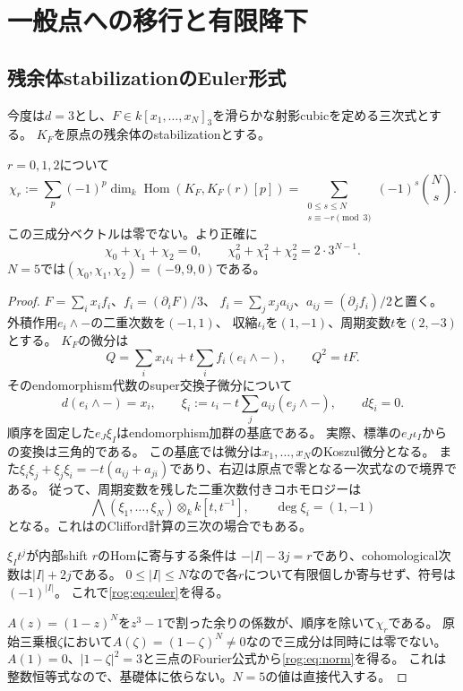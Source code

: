 \section{一般点への移行と有限降下}\label{rog:sec:generic}

\subsection{残余体stabilizationのEuler形式}

今度は$d=3$とし、$F\in k[x_1,\ldots,x_N]_3$を滑らかな射影cubicを定める三次式とする。
$K_F$を原点の残余体のstabilizationとする。
\begin{proposition}[非零のEulerベクトル]\label{rog:prop:euler}
$r=0,1,2$について
\[
 \chi_r:=\sum_p(-1)^p\dim_k\operatorname{Hom}(K_F,K_F(r)[p])
 =\sum_{\substack{0\le s\le N\\s\equiv-r\pmod3}}(-1)^s\binom Ns.
 \tag{RO3}\label{rog:eq:euler}
\]
この三成分ベクトルは零でない。より正確に
\[
 \chi_0+\chi_1+\chi_2=0,\qquad
 \chi_0^2+\chi_1^2+\chi_2^2=2\cdot3^{N-1}.
 \tag{RO4}\label{rog:eq:norm}
\]
$N=5$では$(\chi_0,\chi_1,\chi_2)=(-9,9,0)$である。
\end{proposition}
\begin{proof}
$F=\sum_i x_if_i$、$f_i=(\partial_iF)/3$、
$f_i=\sum_jx_ja_{ij}$、$a_{ij}=(\partial_jf_i)/2$と置く。
外積作用$e_i\wedge-$の二重次数を$(-1,1)$、
収縮$\iota_i$を$(1,-1)$、周期変数$t$を$(2,-3)$とする。
$K_F$の微分は
\[
 Q=\sum_i x_i\iota_i+t\sum_i f_i(e_i\wedge-),\qquad Q^2=tF.
\]
そのendomorphism代数のsuper交換子微分について
\[
 d(e_i\wedge-)=x_i,\qquad
 \xi_i:=\iota_i-t\sum_j a_{ij}(e_j\wedge-),\qquad d\xi_i=0.
\]
順序を固定した$e_J\xi_I$はendomorphism加群の基底である。
実際、標準の$e_J\iota_I$からの変換は三角的である。
この基底では微分は$x_1,\ldots,x_N$のKoszul微分となる。
また$\xi_i\xi_j+\xi_j\xi_i=-t(a_{ij}+a_{ji})$であり、右辺は原点で零となる一次式なので境界である。
従って、周期変数を残した二重次数付きコホモロジーは
\[
 \bigwedge(\xi_1,\ldots,\xi_N)\otimes_k k[t,t^{-1}],
 \qquad\deg\xi_i=(1,-1)
 \tag{RO5}\label{rog:eq:exterior}
\]
となる。これは\cite[\S5.6]{ROGDyckerhoff}のClifford計算の三次の場合でもある。

$\xi_I t^j$が内部shift $r$のHomに寄与する条件は
$-|I|-3j=r$であり、cohomological次数は$|I|+2j$である。
$0\le|I|\le N$なので各$r$について有限個しか寄与せず、符号は$(-1)^{|I|}$。
これで\eqref{rog:eq:euler}を得る。

$A(z)=(1-z)^N$を$z^3-1$で割った余りの係数が、順序を除いて$\chi_r$である。
原始三乗根$\zeta$において$A(\zeta)=(1-\zeta)^N\ne0$なので三成分は同時には零でない。
$A(1)=0$、$|1-\zeta|^2=3$と三点のFourier公式から\eqref{rog:eq:norm}を得る。
これは整数恒等式なので、基礎体に依らない。$N=5$の値は直接代入する。
\end{proof}

